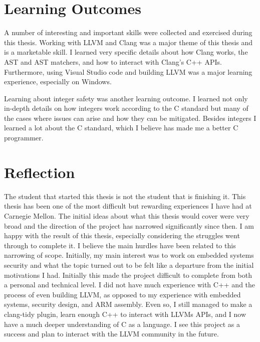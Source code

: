 \section{Learning Outcomes}

A number of interesting and important skills were collected and exercised during this thesis. Working with LLVM and Clang was a major theme of this thesis and is a marketable skill. I learned very specific details about how Clang works, the AST and AST matchers, and how to interact with Clang's C++ APIs. Furthermore, using Visual Studio code and building LLVM was a major learning experience, especially on Windows.

Learning about integer safety was another learning outcome. I learned not only in-depth details on how integers work according to the C standard but many of the cases where issues can arise and how they can be mitigated. Besides integers I learned a lot about the C standard, which I believe has made me a better C programmer.

\section{Reflection}

The student that started this thesis is not the student that is finishing it. This thesis has been one of the most difficult but rewarding experiences I have had at Carnegie Mellon. The initial ideas about what this thesis would cover were very broad and the direction of the project has narrowed significantly since then. I am happy with the result of this thesis, especially considering the struggles went through to complete it. I believe the main hurdles have been related to this narrowing of scope. Initially, my main interest was to work on embedded systems security and what the topic turned out to be felt like a departure from the initial motivations I had. Initially this made the project difficult to complete from both a personal and technical level. I did not have much experience with C++ and the process of even building LLVM, as opposed to my experience with embedded systems, security design, and ARM assembly. Even so, I still managed to make a clang-tidy plugin, learn enough C++ to interact with LLVMs APIs, and I now have a much deeper understanding of C as a language. I see this project as a success and plan to interact with the LLVM community in the future.